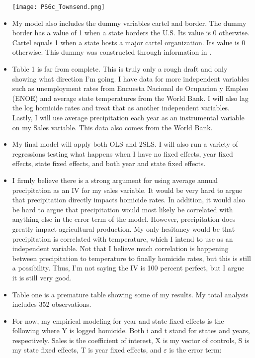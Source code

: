 \documentclass[12pt]{article}
\begin{document}
\begin{itemize}
    \texttt{[image: PS6c\_Townsend.png]}
    
    \item
    My model also includes the dummy variables cartel and border. The dummy border has a value of 1 when a state borders the U.S. Its value is 0 otherwise. Cartel equals 1 when a state hosts a major cartel organization. Its value is 0 otherwise. This dummy was constructed through information in \cite{beittel2015mexico}.
    
    \item Table 1 is far from complete. This is truly only a rough draft and only showing what direction I'm going. I have data for more independent variables such as unemployment rates from Encuesta Nacional de Ocupacion y Empleo (ENOE) and average state temperatures from the World Bank. I will also lag the log homicide rates and treat that as another independent variables. Lastly, I will use average precipitation each year as an instrumental variable on my Sales variable. This data also comes from the World Bank.
    
    \item My final model will apply both OLS and 2SLS. I will also run a variety of regressions testing what happens when I have no fixed effects, year fixed effects, state fixed effects, and both year and state fixed effects. 
    
    \item I firmly believe there is a strong argument for using average annual precipitation as an IV for my sales variable. It would be very hard to argue that precipitation directly impacts homicide rates. In addition, it would also be hard to argue that precipitation would most likely be correlated with anything else in the error term of the model. However, precipitation does greatly impact agricultural production. My only hesitancy would be that precipitation is correlated with temperature, which I intend to use as an independent variable. Not that I believe much correlation is happening between precipitation to temperature to finally homicide rates, but this is still a possibility. Thus, I'm not saying the IV is 100 percent perfect, but I argue it is still very good. 
    
    \item Table one is a premature table showing some of my results. My total analysis includes 352 observations. 
    
    \item For now, my empirical modeling for year and state fixed effects is the following where Y is logged homicide. Both i and t stand for states and years, respectively. Sales is the coefficient of interest, X is my vector of controls, S is my state fixed effects, T is year fixed effects, and $\varepsilon$ is the error term: 
    


\end{itemize}
\end{document}
